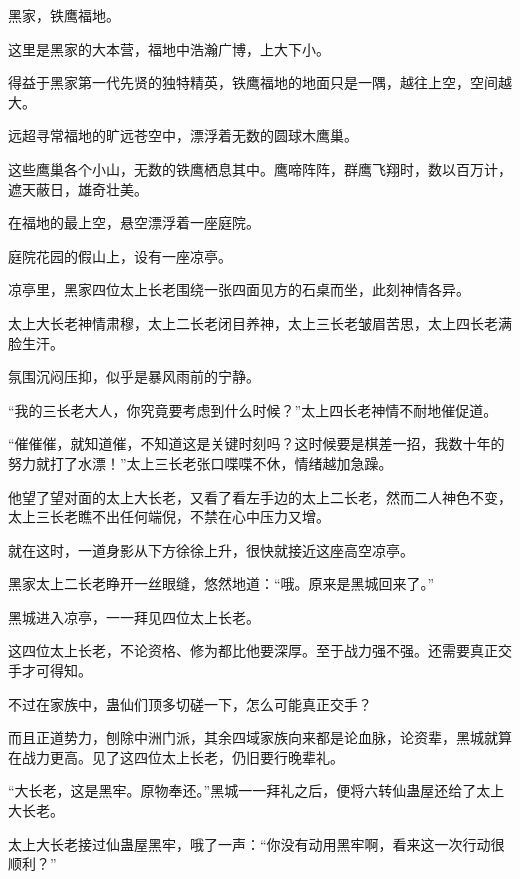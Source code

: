 
\begin{this_body}



黑家，铁鹰福地。

这里是黑家的大本营，福地中浩瀚广博，上大下小。

得益于黑家第一代先贤的独特精英，铁鹰福地的地面只是一隅，越往上空，空间越大。

远超寻常福地的旷远苍空中，漂浮着无数的圆球木鹰巢。

这些鹰巢各个小山，无数的铁鹰栖息其中。鹰啼阵阵，群鹰飞翔时，数以百万计，遮天蔽日，雄奇壮美。

在福地的最上空，悬空漂浮着一座庭院。

庭院花园的假山上，设有一座凉亭。

凉亭里，黑家四位太上长老围绕一张四面见方的石桌而坐，此刻神情各异。

太上大长老神情肃穆，太上二长老闭目养神，太上三长老皱眉苦思，太上四长老满脸生汗。

氛围沉闷压抑，似乎是暴风雨前的宁静。

“我的三长老大人，你究竟要考虑到什么时候？”太上四长老神情不耐地催促道。

“催催催，就知道催，不知道这是关键时刻吗？这时候要是棋差一招，我数十年的努力就打了水漂！”太上三长老张口喋喋不休，情绪越加急躁。

他望了望对面的太上大长老，又看了看左手边的太上二长老，然而二人神色不变，太上三长老瞧不出任何端倪，不禁在心中压力又增。

就在这时，一道身影从下方徐徐上升，很快就接近这座高空凉亭。

黑家太上二长老睁开一丝眼缝，悠然地道：“哦。原来是黑城回来了。”

黑城进入凉亭，一一拜见四位太上长老。

这四位太上长老，不论资格、修为都比他要深厚。至于战力强不强。还需要真正交手才可得知。

不过在家族中，蛊仙们顶多切磋一下，怎么可能真正交手？

而且正道势力，刨除中洲门派，其余四域家族向来都是论血脉，论资辈，黑城就算在战力更高。见了这四位太上长老，仍旧要行晚辈礼。

“大长老，这是黑牢。原物奉还。”黑城一一拜礼之后，便将六转仙蛊屋还给了太上大长老。

太上大长老接过仙蛊屋黑牢，哦了一声：“你没有动用黑牢啊，看来这一次行动很顺利？”


\end{this_body}

